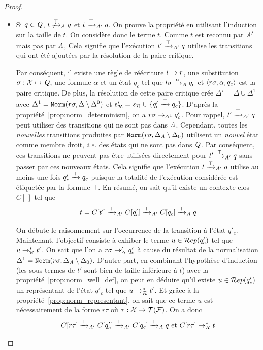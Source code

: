 \begin{proof}
\begin{enumerate}
\begin{itemize}
  \item Si $q\in\mathit Q$, $t \not\xrightarrow{\top}_\mathit A q$ et $t \xrightarrow{\top}_{\mathit A'} q$. On prouve la propriété en utilisant l'induction
    sur la taille de $t$. On considère donc le terme $t$. Comme $t$ est reconnu
    par $\mathit A'$ mais pas par $\mathit A$, Cela signifie que l'exécution $t' \xrightarrow{\top}_{\mathit A'} q$ utilise
    les transitions qui ont été ajoutées par la résolution de la paire critique.
    
    Par conséquent, il existe une règle de réécriture $l \rightarrow r$, une substitution $\sigma:\mathcal X \mapsto \mathit Q$,
    une formule $\alpha$ et un état  $q_c$ tel que $l\sigma \xrightarrow{\alpha}_\mathit A q_c$ et $\langle
    r\sigma, \alpha, q_c\rangle$ est la paire critique. De plus, la résolution de cette paire
    critique crée $\Delta'= \Delta \cup \Delta^1$ avec $\Delta^1 = \mathtt{Norm}(r\sigma,\Delta \setminus \Delta^0)$
    et $\upvarepsilon_{\mathcal R}'=\upvarepsilon_{\mathcal R} \cup \{q'_c \xrightarrow{\top} q_c\}$.
    D'après la propriété~\ref{prop:norm_determinism}, on a $r\sigma \rightarrow_{\Delta^1} q'_c$.
    Pour rappel, $t' \xrightarrow{\top}_{\mathit A'} q$ peut utiliser des transitions qui ne sont pas dans $\mathit A$. 
    Cependant, toutes les {\em nouvelles} transitions produites par
    $\mathtt{Norm}(r\sigma,\Delta_\mathit A\setminus \Delta_0)$ utilisent un {\em nouvel} état comme membre droit,
    \textit{i.e.} des états qui ne sont pas dans $\mathit Q$. Par conséquent, ces transitions
    ne peuvent pas être utilisées directement pour $t' \xrightarrow{\top}_{\mathit A'} q$ sans passer par ces nouveaux états. Cela signifie
    que l'exécution  $t \xrightarrow{\top}_{\mathit A'} q$ utilise au moins une fois $q'_c \xrightarrow{\top} q_c$
    puisque la totalité de l'exécution considérée est étiquetée par la formule $\top$. 
    En résumé, on sait qu'il existe un contexte clos $C[\,]$ tel que
    \[t=C[t'] \xrightarrow{\top}_{\mathit A'} C[q'_c] \xrightarrow{\top}_{\mathit A'} C[q_c] \xrightarrow{\top}_\mathit A q\]

    On débute le raisonnement sur l'occurrence de la transition à l'état $q'_c$. 
    Maintenant, l'objectif consiste à exhiber le terme $u\in \mathcal R ep(q_c')$ tel que $u \rightarrow_\mathcal R^* t'$. 
    On sait que l'on a $r\sigma \rightarrow_\Delta' q'_c$ à cause du résultat de la normalisation $\Delta^1= \mathtt{Norm}(r\sigma,\Delta_\mathit A\setminus \Delta_0)$.
    D'autre part, en combinant l'hypothèse d'induction (les sous-termes de $t'$ sont bien de taille inférieure à $t$) avec la propriété~\ref{prop:norm_well_def},
    on peut en déduire qu'il existe $u \in \mathcal R ep(q_c')$ un représentant de l'état $q'_c$ tel que $u \rightarrow_\mathcal R^* t'$.
    Et grâce à la propriété~\ref{prop:norm_representant}, on sait que ce terme $u$ est nécessairement de la forme $r\tau$ où $\tau : \mathcal X \rightarrow \mathcal{T(F)}$.
    On a donc
    \[ C[r\tau] \xrightarrow{\top}_{\mathit A'} C[q'_c] \xrightarrow{\top}_{\mathit A'} C[q_c] \xrightarrow{\top}_\mathit A q \textrm{ et } C[r\tau] \rightarrow_\mathcal R^* t \]
    

\end{itemize}
\end{enumerate}
\end{proof}
